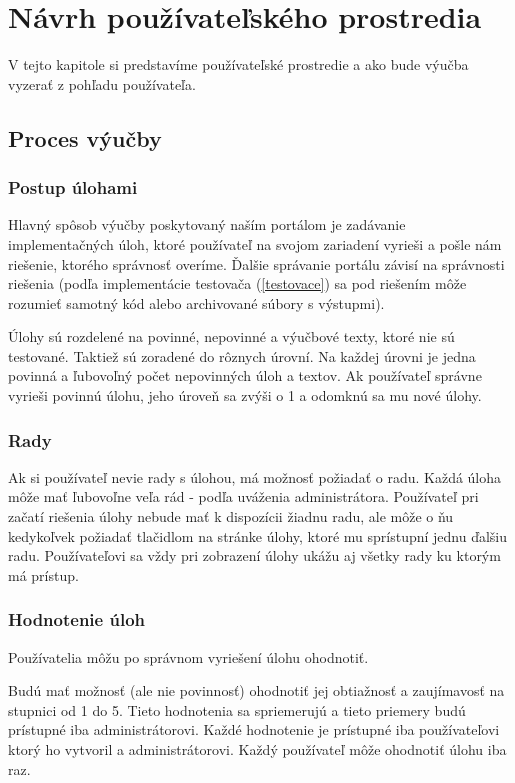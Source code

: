 \chapter{Návrh používateľského prostredia}

\label{kap:front}

V tejto kapitole si predstavíme používateľské prostredie a ako bude výučba vyzerať
z pohľadu používateľa.

\section{Proces výučby}
\subsection{Postup úlohami}
Hlavný spôsob výučby poskytovaný naším portálom je zadávanie implementačných úloh,
ktoré používateľ na svojom zariadení vyrieši a pošle nám riešenie, ktorého správnosť
overíme. Ďalšie správanie portálu závisí na správnosti riešenia
(podľa implementácie testovača (\ref{testovace}) sa pod riešením môže rozumieť
samotný kód alebo archivované súbory s výstupmi).

Úlohy sú rozdelené na povinné, nepovinné a výučbové texty, ktoré nie sú testované.
Taktiež sú zoradené do rôznych úrovní.
Na každej úrovni je jedna povinná a ľubovoľný počet nepovinných úloh a textov.
Ak používateľ správne vyrieši povinnú úlohu, jeho úroveň sa zvýši o 1 a
odomknú sa mu nové úlohy.

\subsection{Rady}
Ak si používateľ nevie rady s úlohou, má možnosť požiadať o radu. Každá úloha
môže mať ľubovoľne veľa rád - podľa uváženia administrátora. Používateľ pri začatí riešenia
úlohy nebude mať k dispozícii žiadnu radu, ale môže o ňu kedykoľvek požiadať tlačidlom na
stránke úlohy, ktoré mu sprístupní jednu ďalšiu radu.
Používateľovi sa vždy pri zobrazení úlohy ukážu aj všetky rady ku ktorým má prístup.

\subsection{Hodnotenie úloh}
\label{rating}
Používatelia môžu po správnom vyriešení úlohu ohodnotiť.

Budú mať možnosť (ale nie povinnosť) ohodnotiť jej obtiažnosť a
zaujímavosť na stupnici od 1 do 5. Tieto hodnotenia sa spriemerujú a tieto priemery
budú prístupné iba administrátorovi. Každé hodnotenie je prístupné iba používateľovi ktorý
ho vytvoril a administrátorovi. Každý používateľ môže ohodnotiť úlohu iba raz.

